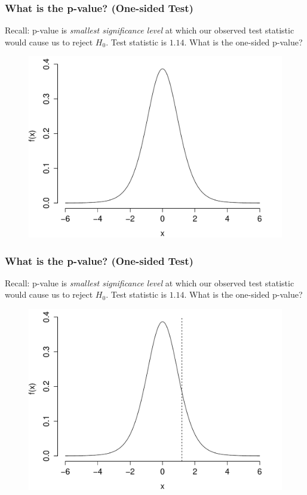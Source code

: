 \documentclass[handout]{beamer}
\begin{document}
\begin{frame}
\frametitle{What is the p-value? (One-sided Test)}
\footnotesize
Recall: p-value is \emph{smallest significance level} at which our observed test statistic would cause us to reject $H_0$. \alert{Test statistic is $1.14$. What is the one-sided p-value? }
\begin{figure}
\includegraphics[scale= 0.4]{./images/p_upper1}

\end{figure}

\end{frame}

\begin{frame}
\frametitle{What is the p-value? (One-sided Test)}
\footnotesize
Recall: p-value is \emph{smallest significance level} at which our observed test statistic would cause us to reject $H_0$. \alert{Test statistic is $1.14$. What is the one-sided p-value? }
\begin{figure}
\includegraphics[scale= 0.4]{./images/p_upper2}

\end{figure}

\end{frame}
\end{document}

